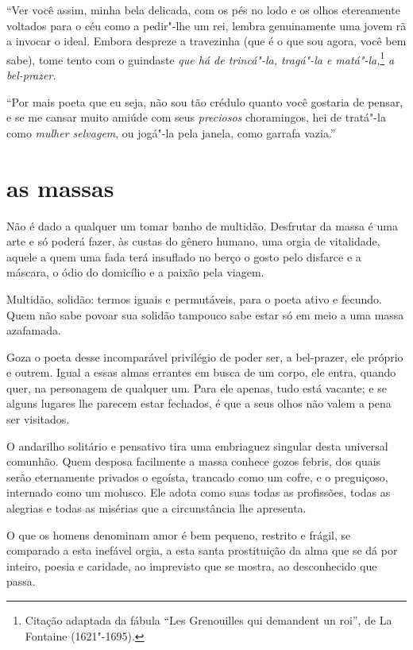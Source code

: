 “Ver você assim, minha bela delicada, com os pés no lodo e
os olhos etereamente voltados para o céu como a pedir"-lhe um rei,
lembra genuinamente uma jovem rã a invocar o ideal. Embora
despreze a travezinha (que é o que sou agora, você bem sabe), tome
tento com o guindaste \textit{que há de trincá"-la, tragá"-la e matá"-la,}\protect\footnote{  Citação 
adaptada da fábula ``Les Grenouilles qui demandent un roi'', 
de La Fontaine (1621"-1695).}
\textit{a bel-prazer.}

\pagebreak 
“Por mais poeta que eu seja, não sou tão crédulo quanto
você gostaria de pensar, e se me cansar muito amiúde com seus \textit{preciosos}
choramingos, hei de tratá"-la como \textit{mulher selvagem}, ou jogá"-la pela
janela, como garrafa vazia.''

\quebra\section[As massas]{as massas}

Não é dado a qualquer um tomar banho de multidão. Desfrutar da massa é uma
arte e só poderá fazer, às custas do gênero humano, uma orgia de
vitalidade, aquele a quem uma fada terá insuflado no berço o gosto
pelo disfarce e a máscara, o ódio do domicílio e a paixão pela
viagem.

Multidão, solidão: termos iguais e permutáveis, para o poeta ativo e
fecundo. Quem não sabe povoar sua solidão tampouco sabe estar só em
meio a uma massa azafamada.

Goza o poeta desse incomparável privilégio de poder ser, a bel-prazer,
ele próprio e outrem. Igual a essas almas errantes em busca de um corpo,
ele entra, quando quer, na personagem de qualquer um. Para ele apenas, tudo
está vacante; e se alguns lugares lhe parecem estar fechados, é que a
seus olhos não valem a pena ser visitados.

O andarilho solitário e pensativo tira uma embriaguez singular desta
universal comunhão. Quem desposa facilmente a massa conhece gozos
febris, dos quais serão eternamente privados o egoísta, trancado como
um cofre, e o preguiçoso, internado como um molusco. Ele adota como
suas todas as profissões, todas as alegrias e todas as misérias que a
circunstância lhe apresenta.

O que os homens denominam amor é bem pequeno, restrito e frágil, se 
comparado a esta inefável orgia, a esta santa prostituição da alma
que se dá por inteiro, poesia e caridade, ao imprevisto que se mostra, ao
desconhecido que passa.

